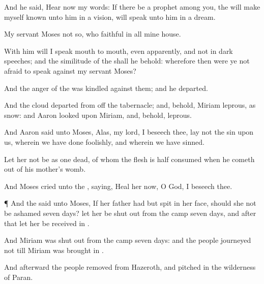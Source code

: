 {And he
said,
Hear now my
words: If there be a
prophet among you,
{} the
{} will make myself
known unto him in a
vision,
{} will
speak unto him in a
dream.

My
servant
Moses
{} not so, who
{}
faithful in all mine
house.

With him will I
speak
mouth to
mouth, even
apparently, and not in dark
speeches; and the
similitude of the
{} shall he
behold: wherefore then were ye not
afraid to
speak against my
servant
Moses?

And the
anger of the
{} was
kindled against them; and he
departed.


\par }{\PP {}And the
cloud
departed from off the
tabernacle; and, behold,
Miriam
{}
leprous,
{} as
snow: and
Aaron
looked upon
Miriam, and, behold,
{}
leprous.

And
Aaron
said unto
Moses,
Alas, my
lord, I beseech thee,
lay not the
sin upon us, wherein we have done
foolishly, and wherein we have
sinned.

Let her not be as one
dead, of whom the
flesh is
half
consumed when he cometh
out of his
mother’s
womb.

And
Moses
cried unto the
{},
saying,
Heal her now, O
God, I beseech thee.


\par }{\PP {}¶ And the
{}
said unto
Moses, If her
father had
but
spit in her
face, should she not be
ashamed
seven
days? let her be
shut
out from the
camp
seven
days, and
after that let her be
received in
{}.

And
Miriam was
shut
out from the
camp
seven
days: and the
people
journeyed not till
Miriam was
brought in
{}.

And
afterward the
people
removed from
Hazeroth, and
pitched in the
wilderness of
Paran.




\par }
